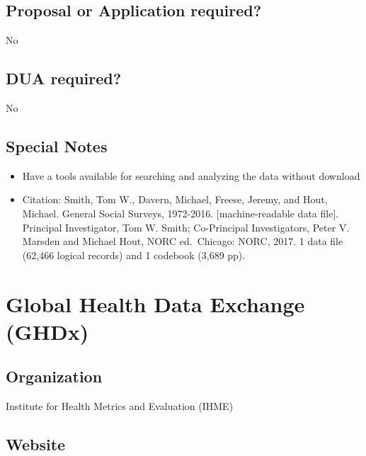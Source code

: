 \documentclass[
]{book}
\providecommand{\tightlist}{%
  \setlength{\itemsep}{0pt}\setlength{\parskip}{0pt}}
\begin{document}
\hypertarget{proposal-or-application-required-28}{%
\section{Proposal or Application required?}\label{proposal-or-application-required-28}}

No

\hypertarget{dua-required-28}{%
\section{DUA required?}\label{dua-required-28}}

No

\hypertarget{special-notes-28}{%
\section{Special Notes}\label{special-notes-28}}

\begin{itemize}
\tightlist
\item
  Have a tools available for searching and analyzing the data without download
\item
  Citation: Smith, Tom W., Davern, Michael, Freese, Jeremy, and Hout, Michael. General Social Surveys, 1972-2016. {[}machine-readable data file{]}. Principal Investigator, Tom W. Smith; Co-Principal Investigators, Peter V. Marsden and Michael Hout, NORC ed.~Chicago: NORC, 2017. 1 data file (62,466 logical records) and 1 codebook (3,689 pp).
\end{itemize}

\mainmatter

\hypertarget{global-health-data-exchange-ghdx}{%
\chapter{Global Health Data Exchange (GHDx)}\label{global-health-data-exchange-ghdx}}

\hypertarget{organization-29}{%
\section{Organization}\label{organization-29}}

Institute for Health Metrics and Evaluation (IHME)

\hypertarget{website-29}{%
\section{Website}\label{website-29}}
\end{document}
